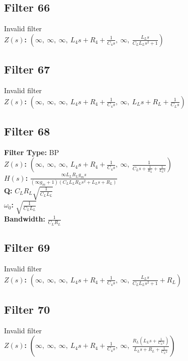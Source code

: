 \documentclass{article}
\begin{document}
\subsection*{Filter 66}
Invalid filter \\ 
\textbf{$Z(s)$:} $\left( \infty, \  \infty, \  \infty, \  L_{4} s + R_{4} + \frac{1}{C_{4} s}, \  \infty, \  \frac{L_{L} s}{C_{L} L_{L} s^{2} + 1}\right)$ \\ 
\subsection*{Filter 67}
Invalid filter \\ 
\textbf{$Z(s)$:} $\left( \infty, \  \infty, \  \infty, \  L_{4} s + R_{4} + \frac{1}{C_{4} s}, \  \infty, \  L_{L} s + R_{L} + \frac{1}{C_{L} s}\right)$ \\ 
\subsection*{Filter 68}
\textbf{Filter Type:} BP \\ 
\textbf{$Z(s)$:} $\left( \infty, \  \infty, \  \infty, \  L_{4} s + R_{4} + \frac{1}{C_{4} s}, \  \infty, \  \frac{1}{C_{L} s + \frac{1}{R_{L}} + \frac{1}{L_{L} s}}\right)$ \\ 
\textbf{$H(s)$:} $\frac{\infty L_{L} R_{L} g_{m} s}{\left(\infty g_{m} + 1\right) \left(C_{L} L_{L} R_{L} s^{2} + L_{L} s + R_{L}\right)}$ \\ 
\textbf{Q:} $C_{L} R_{L} \sqrt{\frac{1}{C_{L} L_{L}}}$ \\ 
\textbf{$\omega_0$:} $\sqrt{\frac{1}{C_{L} L_{L}}}$ \\ 
\textbf{Bandwidth:} $\frac{1}{C_{L} R_{L}}$ \\ 
\subsection*{Filter 69}
Invalid filter \\ 
\textbf{$Z(s)$:} $\left( \infty, \  \infty, \  \infty, \  L_{4} s + R_{4} + \frac{1}{C_{4} s}, \  \infty, \  \frac{L_{L} s}{C_{L} L_{L} s^{2} + 1} + R_{L}\right)$ \\ 
\subsection*{Filter 70}
Invalid filter \\ 
\textbf{$Z(s)$:} $\left( \infty, \  \infty, \  \infty, \  L_{4} s + R_{4} + \frac{1}{C_{4} s}, \  \infty, \  \frac{R_{L} \left(L_{L} s + \frac{1}{C_{L} s}\right)}{L_{L} s + R_{L} + \frac{1}{C_{L} s}}\right)$ \\ 
\end{document}
